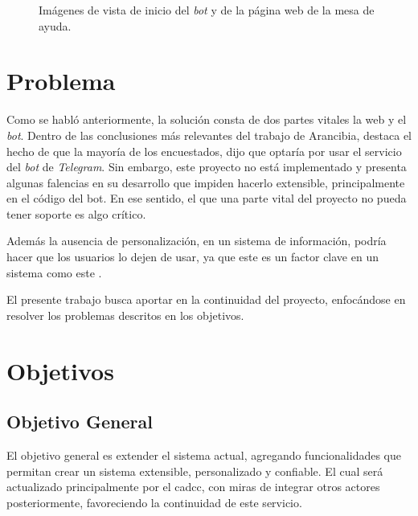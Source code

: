 \begin{figure}[h]
        \caption[Vista inicio del \textit{bot} y página web]{Imágenes de vista de inicio del \textit{bot} y de la página web de la mesa de ayuda.}
        \label{fig:home-img-bot}
    \end{figure}

\section{Problema}\label{sec:intro-pro}
    \par Como se habló anteriormente, la solución consta de dos partes vitales la web y el \textit{bot}. Dentro de las conclusiones más relevantes del trabajo de Arancibia, destaca el hecho de que la mayoría de los encuestados, dijo que optaría por usar el servicio del \textit{bot} de \textit{Telegram}. Sin embargo, este proyecto no está implementado y presenta algunas falencias en su desarrollo que impiden hacerlo extensible, principalmente en el código del bot. En ese sentido, el que una parte vital del proyecto no pueda tener soporte es algo crítico. 
    \par Además la ausencia de personalización, en un sistema de información, podría hacer que los usuarios lo dejen de usar, ya que este es un factor clave en un sistema como este \cite{Paz2021}.
    \par El presente trabajo busca aportar en la continuidad del proyecto, enfocándose en resolver los problemas descritos en los objetivos.

\section{Objetivos}\label{sec:intro-obj}
  \subsection*{Objetivo General}\label{sec:obj-g}
       El objetivo general es extender el sistema actual, agregando funcionalidades que permitan crear un sistema extensible, personalizado y confiable. El cual será actualizado principalmente por el \acrshort{cadcc}, con miras de integrar otros actores posteriormente, favoreciendo la continuidad de este servicio.
        
